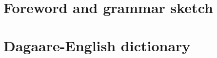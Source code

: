 \documentclass[output=book]{langscibook}
\begin{document}
     

 

\maketitle                
\frontmatter

\tableofcontents
 
 
  
  

\mainmatter         

 
\part{Foreword and grammar sketch}

 
\part{Dagaare-English dictionary}


\end{document}
